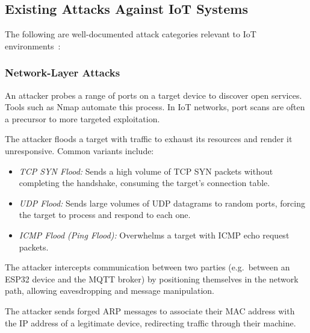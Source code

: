 \documentclass[12pt,a4paper]{article}
\begin{document}
\subsection{Existing Attacks Against IoT Systems}
\label{sec:attacks}

The following are well-documented attack categories relevant to IoT environments~\cite{ferrag2020deep, neshenko2019demystifying, antonakakis2017mirai}:

\subsubsection*{Network-Layer Attacks}

\begin{description}[style=nextline]
    \item[Port Scanning]
    An attacker probes a range of ports on a target device to discover open services. Tools such as Nmap automate this process. In IoT networks, port scans are often a precursor to more targeted exploitation.

    \item[Denial of Service (DoS/DDoS)]
    The attacker floods a target with traffic to exhaust its resources and render it unresponsive. Common variants include:
    \begin{itemize}
        \item \emph{TCP SYN Flood:} Sends a high volume of TCP SYN packets without completing the handshake, consuming the target's connection table.
        \item \emph{UDP Flood:} Sends large volumes of UDP datagrams to random ports, forcing the target to process and respond to each one.
        \item \emph{ICMP Flood (Ping Flood):} Overwhelms a target with ICMP echo request packets.
    \end{itemize}

    \item[Man-in-the-Middle (MitM)]
    The attacker intercepts communication between two parties (e.g.\ between an ESP32 device and the MQTT broker) by positioning themselves in the network path, allowing eavesdropping and message manipulation.

    \item[ARP Spoofing]
    The attacker sends forged ARP messages to associate their MAC address with the IP address of a legitimate device, redirecting traffic through their machine.
\end{description}
\end{document}
